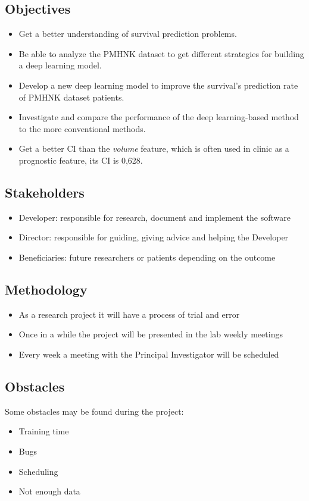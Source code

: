 \subsection{Objectives}
\begin{frame}{\insertsubsec}
  \begin{itemize}
    \item Get a better understanding of survival prediction problems.
    \item Be able to analyze the PMHNK dataset to get different strategies for building a 
    deep learning model.
    \item Develop a new deep learning model to improve the survival's prediction rate of
    PMHNK dataset patients.
    \item Investigate and compare the performance of the deep learning-based method to 
    the more conventional methods.
    \item Get a better CI than the \emph{volume} feature, which is often used in clinic as a
    prognostic feature, its CI is 0,628.
  \end{itemize}
\end{frame}

\subsection{Stakeholders}
\begin{frame}{\insertsubsec}
  \begin{itemize}
    \item Developer: responsible for research, document and implement the software
    \item Director: responsible for guiding, giving advice and helping the Developer
    \item Beneficiaries: future researchers or patients depending on the outcome
  \end{itemize}
\end{frame}

\subsection{Methodology}
\begin{frame}{\insertsubsec}
  \begin{itemize}
    \item As a research project it will have a process of trial and error
    \item Once in a while the project will be presented in the lab weekly meetings
    \item Every week a meeting with the Principal Investigator will be scheduled
  \end{itemize}
\end{frame}

\subsection{Obstacles}
\begin{frame}{\insertsubsec}
  Some obstacles may be found during the project:

  \begin{itemize}
    \item Training time
    \item Bugs
    \item Scheduling
    \item Not enough data
  \end{itemize}
\end{frame}
